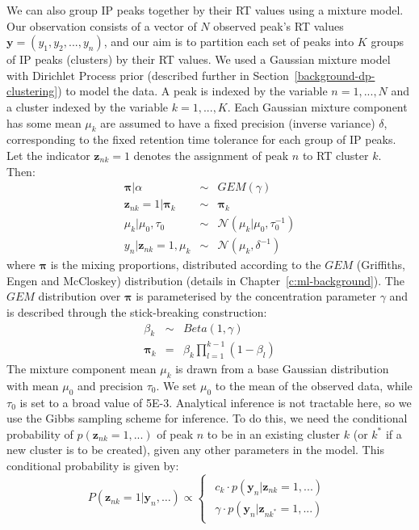 We can also group IP peaks together by their RT values using a mixture model. Our observation consists of a vector of $N$ observed peak's RT values $\mathbf{y}=(y_{1},y_{2},...,y_{n})$, and our aim is to partition each set of peaks into $K$ groups of IP peaks (clusters) by their RT values. We used a Gaussian mixture model with Dirichlet Process prior (described further in Section~\ref{background-dp-clustering}) to model the data. A peak is indexed by the variable $n=1,...,N$ and a cluster indexed by the variable $k=1,...,K$. Each Gaussian mixture component has some mean $\mu_{k}$ are assumed to have a fixed precision (inverse variance) $\delta$, corresponding to the fixed retention time tolerance for each group of IP peaks. Let the indicator $\boldsymbol{z}_{nk}=1$ denotes the assignment of peak $n$ to RT cluster $k$. Then: 
\begin{eqnarray}
\boldsymbol{\pi}|\alpha & \sim & GEM(\gamma)\\
\boldsymbol{z}_{nk}=1|\boldsymbol{\pi}_{k} & \sim & \boldsymbol{\pi}_{k}\\
\mu_{k}|\mu_{0},\tau_{0} & \sim & \mathcal{N}(\mu_{k}|\mu_{0},\tau_{0}^{-1})\\
y_{n}|\boldsymbol{z}_{nk}=1,\mu_{k} & \sim & \mathcal{N}(\mu_{k},\delta^{-1})
\end{eqnarray}
where $\boldsymbol{\pi}$ is the mixing proportions, distributed according to the $GEM$ (Griffiths, Engen and McCloskey) distribution (details in Chapter~\ref{c:ml-background}). The $GEM$ distribution over $\boldsymbol{\pi}$ is parameterised by the concentration parameter $\gamma$ and is described through the stick-breaking construction:
\begin{eqnarray}
\beta_{k} & \sim & Beta(1,\gamma)\\
\boldsymbol{\pi}_{k} & = & \beta_{k}\prod_{l=1}^{k-1}(1-\beta_{l})
\end{eqnarray}
The mixture component mean $\mu_{k}$ is drawn from a base Gaussian distribution with mean $\mu_{0}$ and precision $\tau_{0}$. We set $\mu_{0}$ to the mean of the observed data, while $\tau_{0}$ is set to a broad value of 5E-3. Analytical inference is not tractable here, so we use the Gibbs sampling scheme for inference. To do this, we need the conditional probability of $p(\boldsymbol{z}_{nk}=1,...)$ of peak $n$ to be in an existing cluster $k$ (or $k^{*}$ if a new cluster is to be created), given any other parameters in the model. This conditional probability is given by:
\begin{equation}
P(\boldsymbol{z}_{nk}=1|\mathbf{y}_{n},\ldots)\propto\begin{cases}
\begin{array}{c}
c_{k}\cdot p(\mathbf{y}_{n}|\boldsymbol{z}_{nk}=1,...)\\
\gamma\cdot p(\mathbf{y}_{n}|\boldsymbol{z}_{nk^{*}}=1,...)
\end{array}\end{cases}\label{eq:table_likelihood}
\end{equation}
